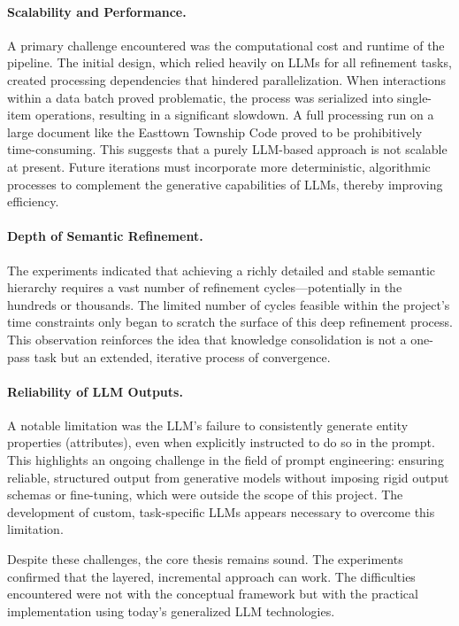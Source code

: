 \paragraph{Scalability and Performance.}
A primary challenge encountered was the computational cost and runtime of the pipeline. The initial design, which relied heavily on LLMs for all refinement tasks, created processing dependencies that hindered parallelization. When interactions within a data batch proved problematic, the process was serialized into single-item operations, resulting in a significant slowdown. A full processing run on a large document like the Easttown Township Code proved to be prohibitively time-consuming. This suggests that a purely LLM-based approach is not scalable at present. Future iterations must incorporate more deterministic, algorithmic processes to complement the generative capabilities of LLMs, thereby improving efficiency.

\paragraph{Depth of Semantic Refinement.}
The experiments indicated that achieving a richly detailed and stable semantic hierarchy requires a vast number of refinement cycles—potentially in the hundreds or thousands. The limited number of cycles feasible within the project's time constraints only began to scratch the surface of this deep refinement process. This observation reinforces the idea that knowledge consolidation is not a one-pass task but an extended, iterative process of convergence.

\paragraph{Reliability of LLM Outputs.}
A notable limitation was the LLM's failure to consistently generate entity properties (attributes), even when explicitly instructed to do so in the prompt. This highlights an ongoing challenge in the field of prompt engineering: ensuring reliable, structured output from generative models without imposing rigid output schemas or fine-tuning, which were outside the scope of this project. The development of custom, task-specific LLMs appears necessary to overcome this limitation.

Despite these challenges, the core thesis remains sound. The experiments confirmed that the layered, incremental approach can work. The difficulties encountered were not with the conceptual framework but with the practical implementation using today's generalized LLM technologies.

